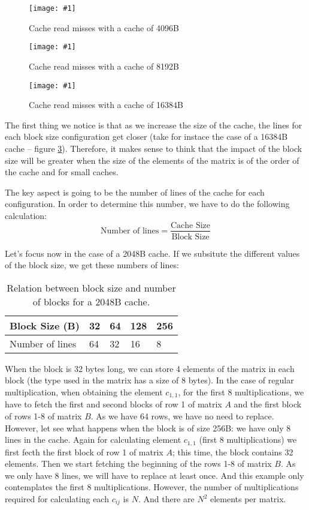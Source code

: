 \documentclass{article}
\newcommand{\myFigure}[4]{%
    \begin{figure}[!ht]
        \texttt{[image: \#1]}
        \centering
        \caption{#2}
        \label{#3}
    \end{figure}
}
\begin{document}
\pagebreak

\myFigure{../material_P3/protect_out4/BlockSize_4096/cache_lectura.png}{Cache read misses with a cache of 4096B}{block_4096_lec}{0.52}

\myFigure{../material_P3/protect_out4/BlockSize_8192/cache_lectura.png}{Cache read misses with a cache of 8192B}{block_8192B_lec}{0.52}

\pagebreak

\myFigure{../material_P3/protect_out4/BlockSize_16384/cache_lectura.png}{Cache read misses with a cache of 16384B}{block_16384B_lec}{0.52}


The first thing we notice is that as we increase the size of the cache, the lines for each block size configuration get closer (take for instace the case of a 16384B cache -- figure \ref{block_16384B_lec}).  Therefore, it makes sense to think that the impact of the block size will be greater when the size of the elements of the matrix is of the order of the cache and for small caches.

The key aspect is going to be the number of lines of the cache for each configuration. In order to determine this number, we have to do the following calculation: 
\[
\text{Number of lines} = \frac{\text{Cache Size}}{\text{Block Size}}
\]

Let's focus now in the case of a 2048B cache. If we subsitute the different values of the block size, we get these numbers of lines:

{
\begin{table}[!ht]
    \centering
    \begin{tabular}{lllll}
    \hline
    \multicolumn{1}{|l|}{Block Size (B)}      & \multicolumn{1}{l|}{32} & \multicolumn{1}{l|}{64} & \multicolumn{1}{l|}{128} & \multicolumn{1}{l|}{256} \\ \hline
    \multicolumn{1}{|l|}{Number of lines} & \multicolumn{1}{l|}{64} & \multicolumn{1}{l|}{32} & \multicolumn{1}{l|}{16}  & \multicolumn{1}{l|}{8}   \\ \hline                    
    \end{tabular}
    \caption{\label{tab:table-name}Relation between block size and number of blocks for a 2048B cache.}
\end{table}
}


When the block is 32 bytes long, we can store 4 elements of the matrix in each block (the type used in the matrix has a size of 8 bytes). In the case of regular multiplication, when obtaining the element $c_{1,1}$, for the first 8 multiplications, we have to fetch the first and second blocks of row 1 of matrix $A$ and the first block of rows 1-8 of matrix $B$. As we have 64 rows, we have no need to replace. However, let see what happens when the block is of size 256B: we have only 8 lines in the cache. Again for calculating element $c_{1,1}$ (first 8 multiplications) we first fecth the first block of row 1 of matrix $A$; this time, the block contains 32 elements. Then we start fetching the beginning of the rows 1-8 of matrix $B$. As we only have 8 lines, we will have to replace at least once. And this example only contemplates the first 8 multiplications. However, the number of multiplications required for calculating each $c_{ij}$ is $N$. And there are $N^2$ elements per matrix.
\end{document}
